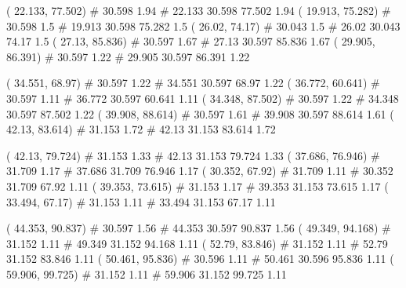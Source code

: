 \documentclass[a4paper,openbib,10pt]{article}
\newenvironment{treegraph}{\begin{graph}}{\end{graph}}
\begin{document}
\begin{treegraph}
  ( 22.133, 77.502) #     30.598    1.94
   #    22.133    30.598    77.502    1.94
  ( 19.913, 75.282) #     30.598    1.5
   #    19.913    30.598    75.282    1.5
  ( 26.02, 74.17) #     30.043    1.5
   #    26.02    30.043    74.17    1.5
  ( 27.13, 85.836) #     30.597    1.67
   #    27.13    30.597    85.836    1.67
  ( 29.905, 86.391) #     30.597    1.22
   #    29.905    30.597    86.391    1.22

  ( 34.551, 68.97) #     30.597    1.22
   #    34.551    30.597    68.97    1.22
  ( 36.772, 60.641) #     30.597    1.11
   #    36.772    30.597    60.641    1.11
  ( 34.348, 87.502) #     30.597    1.22
   #    34.348    30.597    87.502    1.22
  ( 39.908, 88.614) #     30.597    1.61
   #    39.908    30.597    88.614    1.61
  ( 42.13, 83.614) #     31.153    1.72
   #    42.13    31.153    83.614    1.72

  ( 42.13, 79.724) #     31.153    1.33
   #    42.13    31.153    79.724    1.33
  ( 37.686, 76.946) #     31.709    1.17
   #    37.686    31.709    76.946    1.17
  ( 30.352, 67.92) #     31.709    1.11
   #    30.352    31.709    67.92    1.11
  ( 39.353, 73.615) #     31.153    1.17
   #    39.353    31.153    73.615    1.17
  ( 33.494, 67.17) #     31.153    1.11
   #    33.494    31.153    67.17    1.11

  ( 44.353, 90.837) #     30.597    1.56
   #    44.353    30.597    90.837    1.56
  ( 49.349, 94.168) #     31.152    1.11
   #    49.349    31.152    94.168    1.11
  ( 52.79, 83.846) #     31.152    1.11
   #    52.79    31.152    83.846    1.11
  ( 50.461, 95.836) #     30.596    1.11
   #    50.461    30.596    95.836    1.11
  ( 59.906, 99.725) #     31.152    1.11
   #    59.906    31.152    99.725    1.11


\end{treegraph}
\end{document}

